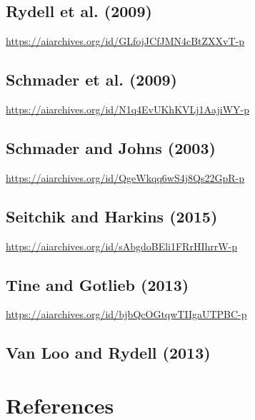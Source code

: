 \documentclass[
  doc, a4paper]{apa7}
\begin{document}
\subsection{Rydell et al. (2009)}\label{rydellmultiplesocialidentities2009}

\url{https://aiarchives.org/id/GLfojJCfJMN4cBtZXXvT-p}

\subsection{Schmader et al. (2009)}\label{schmadermetacognitiveperspectivecognitive2009}

\url{https://aiarchives.org/id/N1q4EvUKhKVLj1AajiWY-p}

\subsection{Schmader and Johns (2003)}\label{schmaderconvergingevidencethat2003}

\url{https://aiarchives.org/id/QgeWkqq6wS4j8Qs22GpR-p}

\subsection{Seitchik and Harkins (2015)}\label{seitchikstereotypethreatmental2015}

\url{https://aiarchives.org/id/sAbgdoBEli1FRrHIhrrW-p}

\subsection{Tine and Gotlieb (2013)}\label{tinegenderraceincomebased2013}

\url{https://aiarchives.org/id/bjbQcOGtqwTIIgaUTPBC-p}

\subsection{Van Loo and Rydell (2013)}\label{vanlooexperiencefeelingpowerful2013}

\section{References}\label{references}
\end{document}
